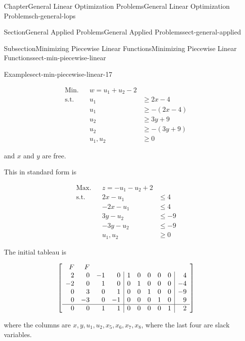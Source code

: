 \documentclass[oneside,10pt,]{book}
\numberwithin{equation}{section}
\newcommand{\amp}{&}
\begin{document}
\begin{chapterptx}{Chapter}{General Linear Optimization Problems}{}{General Linear Optimization Problems}{}{}{ch-general-lops}
\begin{sectionptx}{Section}{General Applied Problems}{}{General Applied Problems}{}{}{sect-general-applied}
\begin{subsectionptx}{Subsection}{Minimizing Piecewise Linear Functions}{}{Minimizing Piecewise Linear Functions}{}{}{sect-min-piecewise-linear}
\begin{example}{Example}{}{sect-min-piecewise-linear-17}
\par
%
\begin{equation*}
\begin{aligned} \text{Min.}\amp\amp w = u_{1} + u_{2} -2\amp\\
\text{s.t.}\amp\amp u_{1}\amp\geq 2x-4 \\
\amp\amp u_{1}\amp\geq -(2x-4) \\
\amp\amp u_{2}\amp\geq 3y+9 \\
\amp\amp u_{2}\amp\geq - (3y+9) \\
\amp\amp u_{1}, u_{2}\amp\geq 0
\end{aligned}
\end{equation*}
%
\par
and \(x\) and \(y\) are free.%
\par
This in standard form is%
\par
%
\begin{equation*}
\begin{aligned} \text{Max.}\amp\amp z = -u_{1}-u_{2}+2 \\
\text{s.t.}\amp\amp2x -u_{1}\amp\leq 4 \\
\amp\amp -2x -u_{1}\amp\leq 4 \\
\amp\amp 3y -u_{2}\amp\leq -9 \\
\amp\amp -3y -u_{2}\amp\leq -9\\
\amp\amp u_{1}, u_{2}\amp\geq 0
\end{aligned}
\end{equation*}
%
\par
The initial tableau is%
\par
%
\begin{equation*}
\left[\begin{array}{rrrr|rrrrr|r}
{\small F} \amp {\small F} \\
2 \amp 0 \amp -1 \amp 0 \amp 1 \amp 0 \amp 0 \amp 0 \amp 0 \amp 4\\
-2 \amp 0 \amp 1 \amp 0 \amp 0 \amp 1 \amp 0 \amp 0 \amp 0 \amp -4\\
0 \amp 3 \amp 0 \amp 1 \amp 0 \amp 0 \amp 1 \amp 0 \amp 0 \amp -9\\
0 \amp -3 \amp 0 \amp -1 \amp 0 \amp 0 \amp 0 \amp 1 \amp 0 \amp 9\\ \hline
0 \amp 0 \amp 1 \amp 1 \amp 0 \amp 0 \amp 0 \amp 0 \amp 1 \amp 2\\
\end{array} \right]
\end{equation*}
%
\par
where the columns are \(x, y, u_1, u_2, x_5, x_6, x_7, x_8\), where the last four are slack variables.%

\end{example}
\end{subsectionptx}
\end{sectionptx}
\end{chapterptx}
\end{document}
